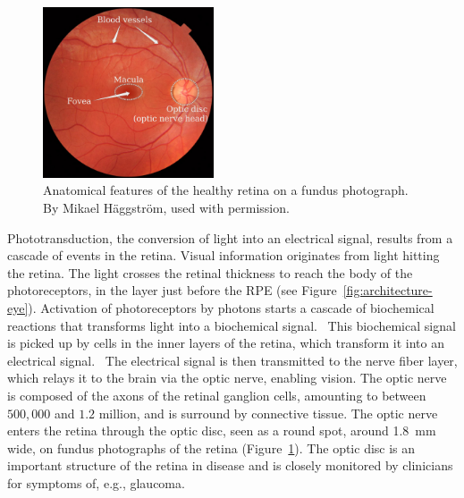 \documentclass{article}
\begin{document}
\begin{figure}[t!]
  \centering
  \includegraphics[width=0.45\textwidth]{FA}
  \caption{Anatomical features of the healthy retina on a fundus photograph. By Mikael H\"aggstr\"om, used with permission.}
  \label{fig:Scans}
\end{figure}


Phototransduction, the conversion of light into an electrical signal, results from a cascade of events in the retina. 
Visual information originates from light hitting the retina.
The light crosses the retinal thickness to reach the body of the photoreceptors, in the layer just before the RPE (see Figure~\ref{fig:architecture-eye}).
Activation of photoreceptors by photons starts a cascade of biochemical reactions that transforms light into a biochemical signal.~\cite{Hurley_2009}
This biochemical signal is picked up by cells in the inner layers of the retina, which transform it into an electrical signal.~\cite{Arslan_2018}
The electrical signal is then transmitted to the nerve fiber layer, which relays it to the brain via the optic nerve, enabling vision.
The optic nerve is composed of the axons of the retinal ganglion cells, amounting to between $500,000$ and $1.2$ million, and is surround by connective tissue\cite{Salazar_2019}.
The optic nerve enters the retina through the optic disc, seen as a round spot, around \SI{1.8}{\mm} wide, on fundus photographs of the retina (Figure~\ref{fig:Scans}).
The optic disc is an important structure of the retina in disease and is closely monitored by clinicians for symptoms of, e.g., glaucoma.
\end{document}
